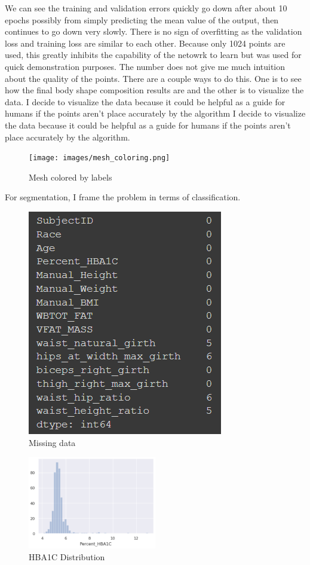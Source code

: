 We can see the training and validation errors quickly go down after about 10 epochs possibly from simply predicting the mean value of the output, then continues to go down very slowly. There is no sign of overfitting as the validation loss and training loss are similar to each other. Because only 1024 points are used, this greatly inhibits the capability of the netowrk to learn but was used for quick demonstration purposes. The number does not give me much intuition about the quality of the points. There are a couple ways to do this. One is to see how the final body shape composition results are and the other is to visualize the data. I decide to visualize the data because it could be helpful as a guide for humans if the points aren't place accurately by the algorithm  I decide to visualize the data because it could be helpful as a guide for humans if the points aren't place accurately by the algorithm. 

\begin{figure}[h]
	\caption{Mesh colored by labels}
	\centering
	\texttt{[image: images/mesh\_coloring.png]}
\end{figure}

For segmentation, I frame the problem in terms of classification.

\begin{figure}[h]
	\caption{Missing data}
	\centering
	\includegraphics[]{images/missing_data.png}
\end{figure}

\begin{figure}[h]
	\caption{HBA1C Distribution}
	\centering
	\includegraphics[width=0.5\textwidth]{images/hba1c.png}
\end{figure}


